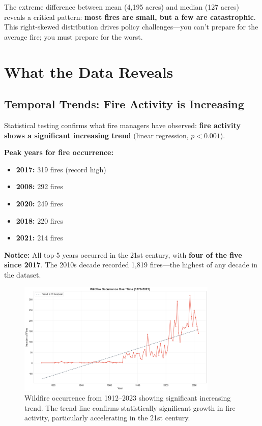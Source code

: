 \documentclass[11pt,a4paper]{article}
\begin{document}
The extreme difference between mean (4,195 acres) and median (127 acres) reveals a critical pattern: \textbf{most fires are small, but a few are catastrophic}. This right-skewed distribution drives policy challenges---you can't prepare for the average fire; you must prepare for the worst.

\section{What the Data Reveals}

\subsection{Temporal Trends: Fire Activity is Increasing}

Statistical testing confirms what fire managers have observed: \textbf{fire activity shows a significant increasing trend} (linear regression, $p < 0.001$).

\textbf{Peak years for fire occurrence:}
\begin{itemize}
    \item \textbf{2017:} 319 fires (record high)
    \item \textbf{2008:} 292 fires
    \item \textbf{2020:} 249 fires
    \item \textbf{2018:} 220 fires
    \item \textbf{2021:} 214 fires
\end{itemize}

\textbf{Notice:} All top-5 years occurred in the 21st century, with \textbf{four of the five since 2017}. The 2010s decade recorded 1,819 fires---the highest of any decade in the dataset.

\begin{figure}[h]
\centering
\includegraphics[width=0.85\textwidth]{fires_over_time.png}
\caption{Wildfire occurrence from 1912--2023 showing significant increasing trend. The trend line confirms statistically significant growth in fire activity, particularly accelerating in the 21st century.}
\label{fig:temporal}
\end{figure}
\end{document}

